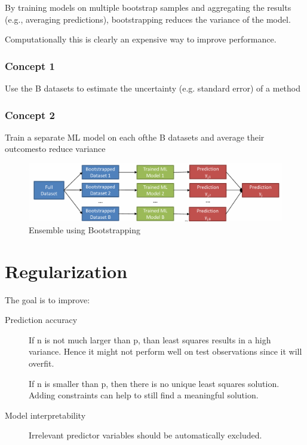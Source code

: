 \documentclass[../Main.tex]{subfiles}
\begin{document}
By training models on multiple bootstrap samples and aggregating
the results (e.g., averaging predictions), bootstrapping reduces the variance of the model.


Computationally this is clearly an 
expensive way to improve 
performance.

\subsubsection{Concept 1} Use the B datasets to
 estimate the uncertainty (e.g.
 standard error) of a method
\subsubsection{Concept 2} Train a separate ML model on each ofthe B datasets and 
average their outcomesto reduce variance

\begin{figure}[H]
    \centering
    \includegraphics[width=1\linewidth]{Images/bootstrapping-ensemble.png}
    \caption{Ensemble using Bootstrapping}
\end{figure}

\newpage
\section{Regularization}
The goal is to improve:
\begin{description}
    \item[Prediction accuracy] If n is not much larger than p, than least 
    squares results in a high variance. Hence it might not perform well on test 
    observations since it will overfit.

    If n is smaller than p, then there is no 
    unique least squares solution. Adding constraints can help to still find a 
    meaningful solution.
    \item[Model interpretability] Irrelevant predictor variables should be 
    automatically excluded.
\end{description}
\end{document}
